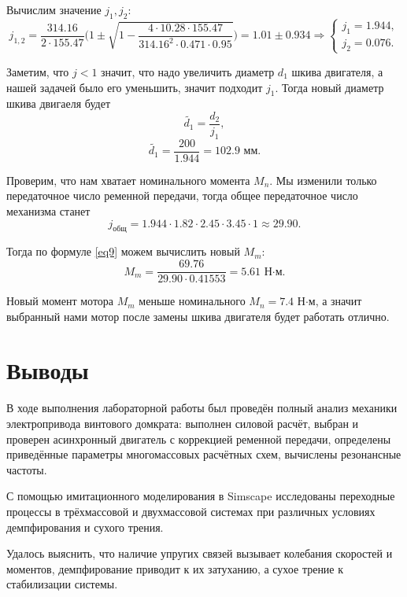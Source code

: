 \documentclass[a4paper, 14pt]{extarticle}
\begin{document}
	
	\par Вычислим значение $j_1,j_2$:
	$$
	j_{1,2}=\dfrac{314.16}{2\cdot155.47}\bigg(1\pm \sqrt{1-\dfrac{4\cdot 10.28\cdot155.47}{314.16^2\cdot 0.471 \cdot 0.95}}\bigg) = 1.01\pm0.934 \Rightarrow\begin{cases}
		j_1=1.944,\\j_2=0.076.
	\end{cases}
	$$
	\par Заметим, что $j<1$ значит, что надо увеличить диаметр $d_1$ шкива двигателя, а нашей задачей было его уменьшить, значит подходит $j_1$. Тогда новый диаметр шкива двигаеля будет 
	\begin{equation}
		\tilde{d_1} = \dfrac{d_2}{j_1},
	\end{equation}
	$$
	\tilde{d_1}  = \dfrac{200}{1.944} = 102.9 \text{ мм}.
	$$
	\par Проверим, что нам хватает номинального момента $M_n$. Мы изменили только передаточное число ременной передачи, тогда общее передаточное число механизма станет
	\[
	j_{\text{общ}} = 1.944 \cdot 1.82 \cdot 2.45 \cdot 3.45\cdot 1
	\approx 29.90.
	\]
	\par Тогда по формуле \ref{eq9} можем вычислить новый $M_m$:
	\[
	M_m =
	\frac{69.76}{29.90 \cdot 0.41553}
	= 5.61 \text{ Н·м}.
	\]
	\par Новый момент мотора $M_m$ меньше номинального $M_n=7.4\text{ Н·м}$, а значит выбранный нами мотор после замены шкива двигателя будет работать отлично.
	
	\newpage

	
	\newpage 
	\section{Выводы}
	
	В ходе выполнения лабораторной работы был проведён полный анализ механики электропривода винтового домкрата: выполнен силовой расчёт, выбран и проверен асинхронный двигатель с коррекцией ременной передачи, определены приведённые параметры многомассовых расчётных схем, вычислены резонансные частоты.
	
	С помощью имитационного моделирования в Simscape исследованы переходные процессы в трёхмассовой и двухмассовой системах при различных условиях демпфирования и сухого трения.
	
	Удалось выяснить, что наличие упругих связей вызывает колебания скоростей и моментов, демпфирование приводит к их затуханию, а сухое трение к стабилизации системы.
	
\end{document}
